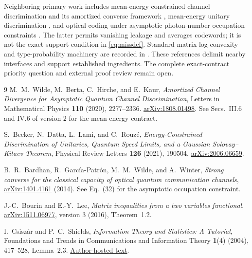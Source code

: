 \documentclass[11pt,a4paper]{article}
\theoremstyle{remark}
\begin{document}
Neighboring primary work includes mean-energy constrained channel
discrimination and its amortized converse framework
\cite{WildeEtAl}, mean-energy unitary discrimination
\cite{BeckerEtAl}, and optical coding under asymptotic photon-number
occupation constraints \cite{BardhanEtAl}.
The latter permits vanishing leakage and averages codewords; it is not
the exact support condition in \eqref{eq:missdef}.
Standard matrix log-convexity and type-probability machinery are recorded
in \cite{BourinLee,CsiszarShields}. These references delimit nearby
interfaces and support established ingredients. The complete exact-contract
priority question and external proof review remain open.

\begin{thebibliography}{9}
M.~M.~Wilde, M.~Berta, C.~Hirche, and E.~Kaur,
\emph{Amortized Channel Divergence for Asymptotic Quantum Channel Discrimination},
Letters in Mathematical Physics \textbf{110} (2020), 2277--2336.
\href{https://arxiv.org/abs/1808.01498}{arXiv:1808.01498}.
See Secs.~III.6 and IV.6 of version 2 for the mean-energy contract.

S.~Becker, N.~Datta, L.~Lami, and C.~Rouz\'e,
\emph{Energy-Constrained Discrimination of Unitaries, Quantum Speed Limits,
and a Gaussian Solovay--Kitaev Theorem},
Physical Review Letters \textbf{126} (2021), 190504.
\href{https://arxiv.org/abs/2006.06659}{arXiv:2006.06659}.

B.~R.~Bardhan, R.~Garc\'ia-Patr\'on, M.~M.~Wilde, and A.~Winter,
\emph{Strong converse for the classical capacity of optical quantum
communication channels},
\href{https://arxiv.org/abs/1401.4161}{arXiv:1401.4161} (2014).
See Eq.~(32) for the asymptotic occupation constraint.

J.-C.~Bourin and E.-Y.~Lee,
\emph{Matrix inequalities from a two variables functional},
\href{https://arxiv.org/abs/1511.06977}{arXiv:1511.06977},
version 3 (2016), Theorem~1.2.

I.~Csisz\'ar and P.~C.~Shields,
\emph{Information Theory and Statistics: A Tutorial},
Foundations and Trends in Communications and Information Theory
\textbf{1}(4) (2004), 417--528, Lemma~2.3.
\href{https://www.renyi.hu/~csiszar/Publications/Information_Theory_and_Statistics:_A_Tutorial.pdf}
{Author-hosted text}.
\end{thebibliography}
\end{document}
